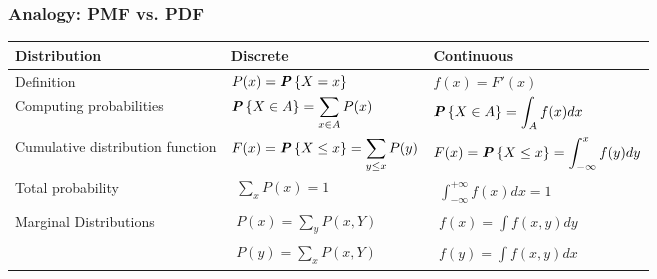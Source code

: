 \subsubsection{Analogy: PMF vs. PDF}
\begin{table}[ht]
  \renewcommand{\arraystretch}{1.5}
  \centering
  \begin{tabular}{|l|l|l|} 
  \hline
  \textbf{Distribution}            & \textbf{Discrete}                               & \textbf{Continuous}                                 \\ 
  \hline
  Definition                       & $P(x) = \textbf{\textit{P}}\left\{X = x\right\}$                           & $f(x) = F'(x)$                                      \\ 
  \hline
  Computing probabilities          & $\begin{aligned}\textbf{\textit{P}}\left\{X \in A\right\} = \sum_{x \in A} P(x)\end{aligned}$          & $\begin{aligned}\textbf{\textit{P}}\left\{X \in A\right\} = \int_A f(x)dx\end{aligned}$                    \\ 
  \hline
  Cumulative
  distribution
  function & $\begin{aligned}F(x) = \textbf{\textit{P}}\left\{X \leq x\right\} = \sum_{y \leq x} P(y)\end{aligned}$ & $\begin{aligned}F(x) = \textbf{\textit{P}}\left\{X \leq x\right\} = \int_{-\infty}^x f(y)dy\end{aligned}$  \\ 
  \hline
  Total probability                & $\begin{aligned}\sum_{x} P(x) = 1\end{aligned}$                             & $\begin{aligned}\int_{-\infty}^{+\infty} f(x)dx = 1\end{aligned}$                \\
  \hline
  \multirow{2}{*}{Marginal
  Distributions} & $\begin{aligned}P(x) = \sum_y P(x, Y)\end{aligned}$                                     & $\begin{aligned}f(x) = \int f(x, y)dy\end{aligned}$                                         \\
                                          & $\begin{aligned}P(y) = \sum_x P(x, Y)\end{aligned}$                                     & $\begin{aligned}f(y) = \int f(x, y)dx\end{aligned}$                                         \\ 

\end{tabular}
\end{table}
